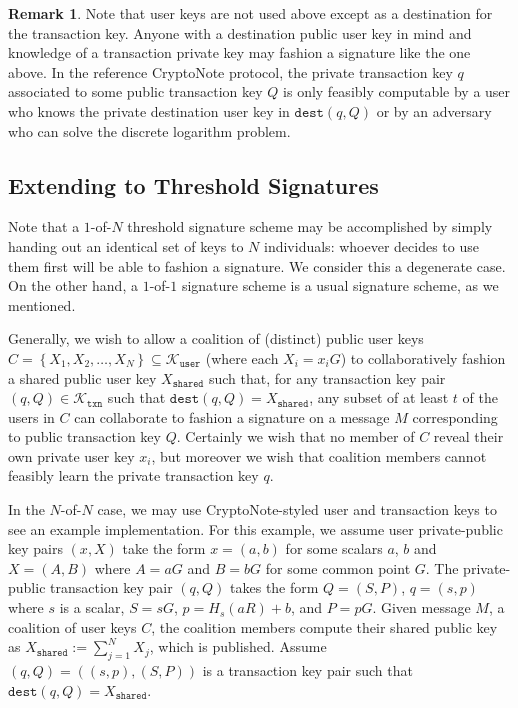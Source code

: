 \documentclass{mrl}
\theoremstyle{definition}
\newtheorem{disc}[theorem]{Remark}
\begin{document}
\begin{disc}
Note that user keys are not used above except as a destination for the transaction key. Anyone with a destination public user key in mind and knowledge of a transaction private key may fashion a signature like the one above. In the reference CryptoNote protocol, the private transaction key $q$ associated to some public transaction key $Q$ is only feasibly computable by a user who knows the private destination user key in $\texttt{dest}(q,Q)$ or by an adversary who can solve the discrete logarithm problem.
\end{disc}

\subsection{Extending to Threshold Signatures} \label{naiveImplement}

Note that a $1$-of-$N$ threshold signature scheme may be accomplished by simply handing out an identical set of keys to $N$ individuals: whoever decides to use them first will be able to fashion a signature. We consider this a degenerate case. On the other hand, a $1$-of-$1$ signature scheme is a usual signature scheme, as we mentioned. 

Generally, we wish to allow a coalition of (distinct) public user keys $C=\left\{X_{1}, X_{2}, \ldots, X_{N}\right\} \subseteq \mathcal{K}_{\texttt{user}}$ (where each $X_i = x_iG$) to collaboratively fashion a shared public user key $X_{\texttt{shared}}$ such that, for any transaction key pair $(q,Q) \in \mathcal{K}_{\texttt{txn}}$ such that $\texttt{dest}(q,Q) = X_{\texttt{shared}}$, any subset of at least $t$ of the users in $C$ can collaborate to fashion a signature on a message $M$ corresponding to public transaction key $Q$. Certainly we wish that no member of $C$ reveal their own private user key $x_i$, but moreover we wish that coalition members cannot feasibly learn the private transaction key $q$. 

In the $N$-of-$N$ case, we may use CryptoNote-styled user and transaction keys to see an example implementation. For this example, we assume user private-public key pairs $(x,X)$ take the form $x=(a,b)$ for some scalars $a$, $b$ and $X=(A,B)$ where $A=aG$ and $B=bG$ for some common point $G$. The private-public transaction key pair $(q,Q)$ takes the form $Q=(S,P)$, $q=(s,p)$ where $s$ is a scalar, $S=sG$, $p=H_s(aR)+b$, and $P=pG$. Given message $M$, a coalition of user keys $C$, the coalition members compute their shared public key as $X_{\texttt{shared}} := \sum_{j=1}^{N} X_j$, which is published. Assume $(q,Q)=((s,p),(S,P))$ is a transaction key pair such that $\texttt{dest}(q,Q) = X_{\texttt{shared}}$.
\end{document}
